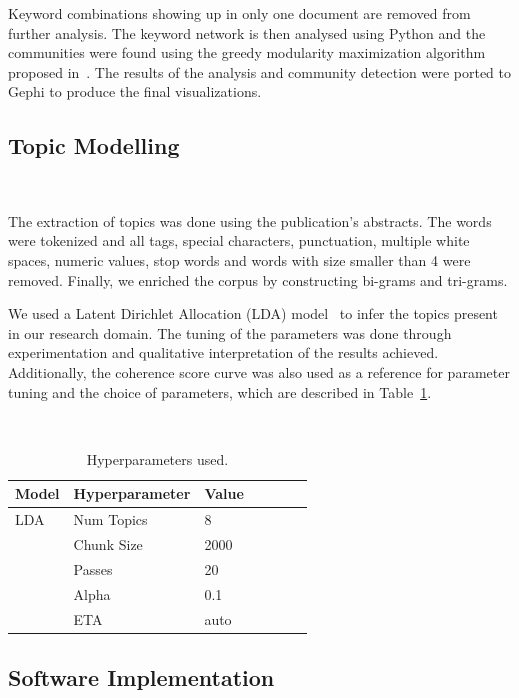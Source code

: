\documentclass[parskip=full]{scrartcl}
\begin{document}
Keyword combinations showing up in only one document are removed from further
analysis. The keyword network is then analysed using Python and the
communities were found using the greedy modularity maximization algorithm
proposed in~\cite{Clauset2004}. The results of the analysis and community
detection were ported to Gephi to produce the final visualizations.

\subsection{Topic Modelling}~\label{sec:topic_modelling}

The extraction of topics was done using the publication's abstracts. The words
were tokenized and all tags, special characters, punctuation, multiple white
spaces, numeric values, stop words and words with size smaller than 4 were
removed. Finally, we enriched the corpus by constructing bi-grams and
tri-grams.

We used a Latent Dirichlet Allocation (LDA) model~\cite{Pritchard2000} to
infer the topics present in our research domain. The tuning of the parameters
was done through experimentation and qualitative interpretation of the results
achieved. Additionally, the coherence score curve was also used as a reference for
parameter tuning and the choice of parameters, which are described in
Table~\ref{tab:hyperparameters}. 

\begin{table}[ht]
    \begin{center}
    \caption{Hyperparameters used.}~\label{tab:hyperparameters}
    \begin{tabular*}{.5\textwidth}{@{\extracolsep{\fill}}lllllll@{\extracolsep{\fill}}}
        \toprule
        Model   &   Hyperparameter  &   Value \\
        \midrule
        LDA     &   Num Topics      &   8     \\
                &   Chunk Size      &   2000  \\
                &   Passes          &   20    \\
                &   Alpha           &   0.1   \\
                &   ETA             &   auto  \\
        \bottomrule
    \end{tabular*}
    \end{center}
\end{table}

\subsection{Software Implementation}~\label{sec:software_implementation}
\end{document}
